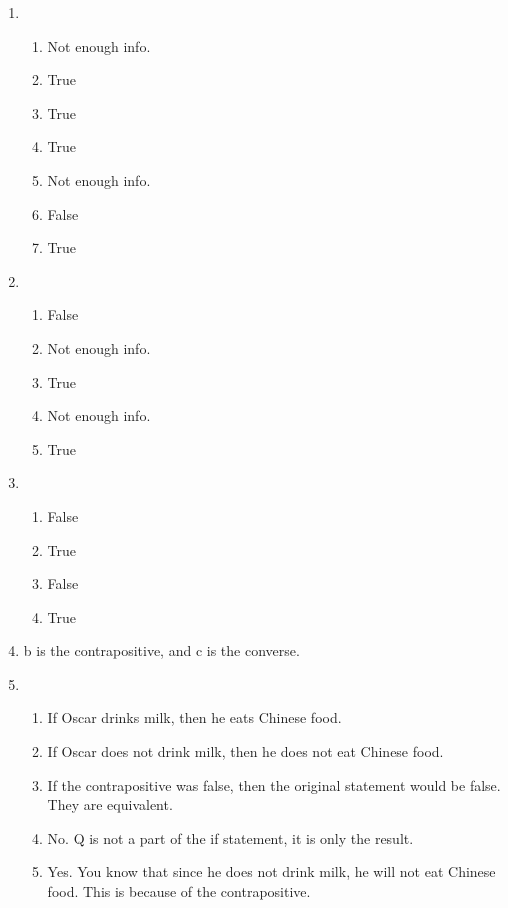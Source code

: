 \begin{enumerate}
        \item
            \begin{enumerate}
                \item Not enough info.
                \item True
                \item True
                \item True
                \item Not enough info.
                \item False
                \item True
            \end{enumerate}
        \item
            \begin{enumerate}
                \item False
                \item Not enough info.
                \item True
                \item Not enough info.
                \item True
            \end{enumerate}
        \item 
            \begin{enumerate}
                \item False
                \item True
                \item False
                \item True
            \end{enumerate}
        \item b is the contrapositive, and c is the converse. 
        \item 
            \begin{enumerate}
                \item If Oscar drinks milk, then he eats Chinese food.
                \item If Oscar does not drink milk, then he does not eat Chinese food.
                \item If the contrapositive was false, then the original statement would be false. They are equivalent.
                \item No. Q is not a part of the if statement, it is only the result.
                \item Yes. You know that since he does not drink milk, he will not eat Chinese food. This is because of the contrapositive.

\end{enumerate}
\end{enumerate}
